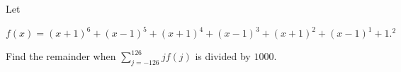 Let

$$
f(x)=(x+1)^{6}+(x-1)^{5}+(x+1)^{4}+(x-1)^{3}+(x+1)^{2}+(x-1)^{1}+1 .^{2}
$$

Find the remainder when $\sum_{j=-126}^{126} j f(j)$ is divided by $1000$.
